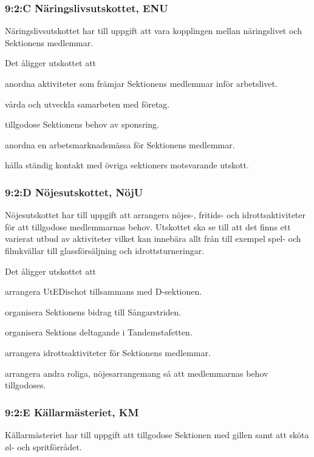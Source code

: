\documentclass[../_main/handlingar.tex]{subfiles}
\begin{document}
\begin{attsatser}
        \subsubsection*{9:2:C Näringslivsutskottet, ENU}
        Näringslivsutskottet har till uppgift att vara kopplingen mellan näringslivet och Sektionens medlemmar.

        Det åligger utskottet att
        \begin{tightdashlist}
        \item anordna aktiviteter som främjar Sektionens medlemmar inför arbetslivet.
        \item vårda och utveckla samarbeten med företag.
        \item tillgodose Sektionens behov av sponsring.
        \item anordna en arbetsmarknadsmässa för Sektionens medlemmar.
        \item hålla ständig kontakt med övriga sektioners motsvarande utskott.
        \end{tightdashlist}

        \subsubsection*{9:2:D Nöjesutskottet, NöjU}
        Nöjesutskottet har till uppgift att arrangera nöjes-, fritids- och idrottsaktiviteter för att tillgodose medlemmarnas behov. Utskottet ska se till att det finns ett varierat utbud av aktiviteter vilket kan innebära allt från till exempel spel- och filmkvällar till glassförsäljning och idrottsturneringar.

        Det åligger utskottet att
        \begin{tightdashlist}
        \item arrangera UtEDischot tillsammans med D-sektionen.
        \item organisera Sektionens bidrag till Sångarstriden.
        \item organisera Sektions deltagande i Tandemstafetten.
        \item arrangera idrottsaktiviteter för Sektionens medlemmar.
        \item arrangera andra roliga, nöjesarrangemang så att medlemmarnas behov tillgodoses.
        \end{tightdashlist}

        \subsubsection*{9:2:E Källarmästeriet, KM}
        Källarmästeriet har till uppgift att tillgodose Sektionen med gillen samt att sköta øl- och spritförrådet.


\end{attsatser}
\end{document}
